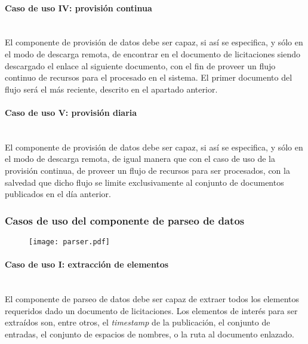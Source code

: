             \paragraph{Caso de uso IV: provisión continua} \mbox{}\\
                El componente de provisión de datos debe ser capaz, si así se especifica, y sólo en el modo de descarga remota, de encontrar en el documento de licitaciones siendo descargado el enlace al siguiente documento, con el fin de proveer un flujo continuo de recursos para el procesado en el sistema. El primer documento del flujo será el más reciente, descrito en el apartado anterior.
                
            \paragraph{Caso de uso V: provisión diaria} \mbox{}\\
                El componente de provisión de datos debe ser capaz, si así se especifica, y sólo en el modo de descarga remota, de igual manera que con el caso de uso de la provisión continua, de proveer un flujo de recursos para ser procesados, con la salvedad que dicho flujo se limite exclusivamente al conjunto de documentos publicados en el día anterior.
                
        \subsubsection{Casos de uso del componente de parseo de datos}
    
            \begin{figure}[h]
                \centering
                \texttt{[image: parser.pdf]}
                \label{fig:parser}
            \end{figure}
            
            \paragraph{Caso de uso I: extracción de elementos} \mbox{}\\
                El componente de parseo de datos debe ser capaz de extraer todos los elementos requeridos dado un documento de licitaciones. Los elementos de interés para ser extraídos son, entre otros, el \textit{timestamp} de la publicación, el conjunto de entradas, el conjunto de espacios de nombres, o la ruta al documento enlazado.
                
